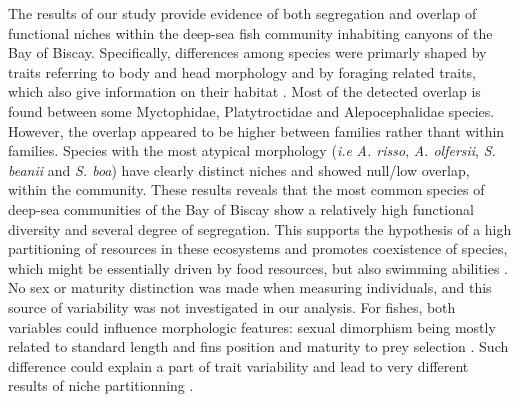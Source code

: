 
The results of our study provide evidence of both segregation and overlap of functional niches within the deep-sea fish community inhabiting canyons of the Bay of Biscay. Specifically, differences among species were primarly shaped by traits referring to body and head morphology and by foraging related traits, which also give information on their habitat \citep{schoenfuss2007}. Most of the detected overlap is found between some Myctophidae, Platytroctidae and Alepocephalidae species. However, the overlap appeared to be higher between families rather thant within families. Species with the most atypical morphology (\emph{i.e} \textit{A. risso}, \textit{A. olfersii}, \textit{S. beanii} and \textit{S. boa}) have clearly distinct niches and showed null/low overlap, within the community. These results reveals that the most common species of deep-sea communities of the Bay of Biscay show a relatively high functional diversity and several degree of segregation. This supports the hypothesis of a high partitioning of resources in these ecosystems and promotes coexistence of species, which might be essentially driven by food resources, but also swimming abilities \citep{aneeshkumar2017,preciado2017}.\\


No sex or maturity distinction was made when measuring individuals, and this source of variability was not investigated in our analysis. For fishes, both variables could influence morphologic features: sexual dimorphism being mostly related to standard length and fins position and maturity to prey selection \citep{geidner2008,nagelkerke2018}. Such difference could explain a part of trait variability and lead to very different results of niche partitionning \citep{dasilva2019,dumay2004,nagelkerke2018}.

